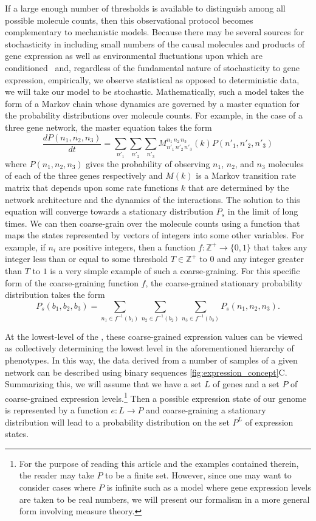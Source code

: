 If a large enough number of thresholds is available to distinguish among all possible molecule counts, then this observational protocol becomes complementary to mechanistic models.  Because there may be several sources for stochasticity in \gnpm{} including small numbers of the causal molecules and products of gene expression as well as environmental fluctuations upon which \gnpm{} are conditioned~\cite{Swain2002,Paulsson2004,Thattai2004,Acar2008a,Lestas2010,Munsky2012,Chalancon2012,Neuert2013,Sanchez2013} and, regardless of the fundamental nature of stochasticity to gene expression, empirically, we observe statistical as opposed to deterministic data, we will take our model to be stochastic.  Mathematically, such a model takes the form of a Markov chain whose dynamics are governed by a master equation for the probability distributions over molecule counts.   For example, in the case of a three gene network, the master equation takes the form
$$
\frac{dP(n_1,n_2,n_3)}{dt} = \sum_{n'_1}\sum_{n'_2}\sum_{n'_3} M^{n_1\,n_2\,n_3}_{n'_1\,n'_2\,n'_3}(k) P(n'_1,n'_2,n'_3)
$$
where $P(n_1,n_2,n_3)$ gives the probability of observing $n_1$, $n_2$, and $n_3$ molecules of each of the three genes respectively and $M(k)$ is a Markov transition rate matrix that depends upon some rate functions $k$ that are determined by the network architecture and the dynamics of the interactions.  The solution to this equation will converge towards  a stationary distribution $P_s$ in the limit of long times. We can then coarse-grain over the molecule counts using a function that maps the states represented by vectors of integers into some other variables. For example, if $n_i$ are positive integers, then a function $f \colon \mathbb{Z}^+ \rightarrow \{0,1\}$ that takes any integer less than or equal to some threshold $T \in \mathbb{Z}^+$ to $0$ and any integer greater than $T$ to $1$ is a very simple example of such a coarse-graining. For this specific form of the coarse-graining function $f$, the coarse-grained stationary probability distribution takes the form
$$
P_s(b_1,b_2,b_3) = \sum_{n_1 \in f^{-1}(b_1)}\sum_{n_2 \in f^{-1}(b_2)}\sum_{n_3 \in f^{-1}(b_3)} P_s(n_1,n_2,n_3).
$$

At the lowest-level of the \gnpm{}, these coarse-grained expression values can be viewed as collectively determining the lowest level in the aforementioned hierarchy of phenotypes. In this way, the data derived from a number of samples of a given network can be described using binary sequences \ref{fig:expression_concept}C.  Summarizing this, we will assume that we have a set $L$ of genes and a set $P$ of coarse-grained expression levels.\footnote{For the purpose of reading this article and the examples contained therein, the reader may take $P$ to be a finite set.  However, since one may want to consider cases where $P$ is infinite such as a model where gene expression levels are taken to be real numbers, we will present our formalism in a more general form involving measure theory.}  Then a possible expression state of our genome is represented by a function $e : L \to P$ and coarse-graining a stationary distribution will lead to a probability distribution on the set $P^L$ of expression states.

